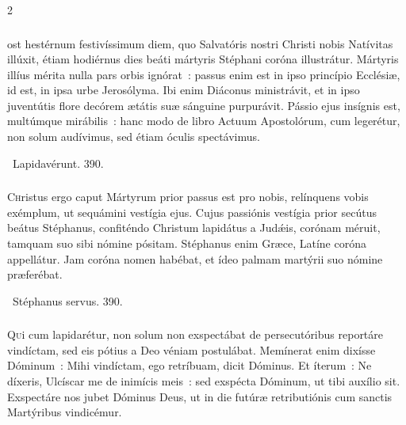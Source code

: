 \documentclass[9pt,twoside]{extarticle}
\begin{document}
\begin{multicols}{2}
\subsubsection*{\center {}}
ost hestérnum festivíssimum diem, quo Salvatóris nostri Christi nobis Natívitas illúxit, étiam hodiérnus dies beáti mártyris Stéphani coróna illustrátur. Mártyris illíus mérita nulla pars orbis ignórat~: passus enim est in ipso princípio Ecclésiæ, id est, in ipsa urbe Jerosólyma. Ibi enim Diáconus ministrávit, et in ipso juventútis flore decórem ætátis suæ sánguine purpurávit. Pássio ejus insígnis est, multúmque mirábilis~: hanc modo de libro Actuum Apostolórum, cum legerétur, non solum audívimus, sed étiam óculis spectávimus.

\begin{tightlist}{}
\item {}~Lapidavérunt. 390.
\end{tightlist}

\subsubsection*{\center {}}
\lettrine{C}hristus ergo caput Mártyrum prior passus est pro nobis, relínquens vobis exémplum, ut sequámini vestígia ejus. Cujus passiónis vestígia prior secútus beátus Stéphanus, confiténdo Christum lapidátus a Judǽis, corónam méruit, tamquam suo sibi nómine pósitam. Stéphanus enim Græce, Latíne coróna appellátur. Jam coróna nomen habébat, et ídeo palmam martýrii suo nómine præferébat. 

\begin{tightlist}{}
\item {}~Stéphanus servus. 390.
\end{tightlist}

\subsubsection*{\center {}}
\lettrine{Q}ui cum lapidarétur, non solum non exspectábat de persecutóribus reportáre vindíctam, sed eis pótius a Deo véniam postulábat. Memínerat enim dixísse Dóminum~: Mihi vindíctam, ego retríbuam, dicit Dóminus. Et íterum~: Ne díxeris, Ulcíscar me de inimícis meis~: sed exspécta Dóminum, ut tibi auxílio sit. Exspectáre nos jubet Dóminus Deus, ut in die futúræ retributiónis cum sanctis Martýribus vindicémur. 


\end{multicols}
\end{document}
